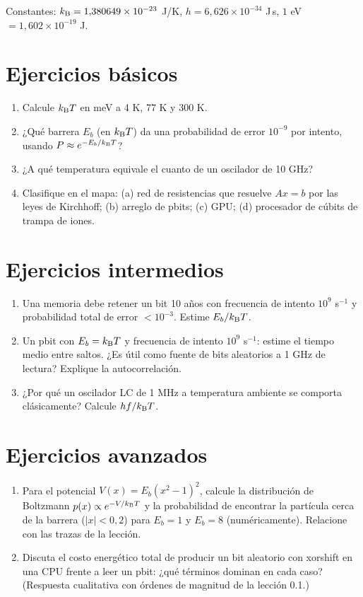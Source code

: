 \documentclass[11pt,a4paper]{article}
\begin{document}
Constantes: $k_{\mathrm B}=1{,}380649\times10^{-23}$ J/K, $h=6{,}626\times10^{-34}$ J\,s, $1$ eV $=1{,}602\times10^{-19}$ J.

\section{Ejercicios básicos}
\begin{enumerate}[label=\textbf{B\arabic*.}]
\item Calcule $k_{\mathrm B} T$ en meV a 4 K, 77 K y 300 K.
\item ¿Qué barrera $E_b$ (en $k_{\mathrm B} T$) da una probabilidad de error $10^{-9}$ por intento, usando $P\approx e^{-E_b/k_{\mathrm B} T}$?
\item ¿A qué temperatura equivale el cuanto de un oscilador de 10 GHz?
\item Clasifique en el mapa: (a) red de resistencias que resuelve $Ax=b$ por las leyes de Kirchhoff; (b) arreglo de pbits; (c) GPU; (d) procesador de cúbits de trampa de iones.
\end{enumerate}

\section{Ejercicios intermedios}
\begin{enumerate}[label=\textbf{I\arabic*.}]
\item Una memoria debe retener un bit 10 años con frecuencia de intento $10^9$ s$^{-1}$ y probabilidad total de error $<10^{-3}$. Estime $E_b/k_{\mathrm B} T$.
\item Un pbit con $E_b=k_{\mathrm B} T$ y frecuencia de intento $10^9$ s$^{-1}$: estime el tiempo medio entre saltos. ¿Es útil como fuente de bits aleatorios a 1 GHz de lectura? Explique la autocorrelación.
\item ¿Por qué un oscilador LC de 1 MHz a temperatura ambiente se comporta clásicamente? Calcule $hf/k_{\mathrm B} T$.
\end{enumerate}

\section{Ejercicios avanzados}
\begin{enumerate}[label=\textbf{A\arabic*.}]
\item Para el potencial $V(x)=E_b(x^2-1)^2$, calcule la distribución de Boltzmann $p(x)\propto e^{-V/k_{\mathrm B} T}$ y la probabilidad de encontrar la partícula cerca de la barrera ($|x|<0{,}2$) para $E_b=1$ y $E_b=8$ (numéricamente). Relacione con las trazas de la lección.
\item Discuta el costo energético total de producir un bit aleatorio con xorshift en una CPU frente a leer un pbit: ¿qué términos dominan en cada caso? (Respuesta cualitativa con órdenes de magnitud de la lección 0.1.)
\end{enumerate}
\end{document}
